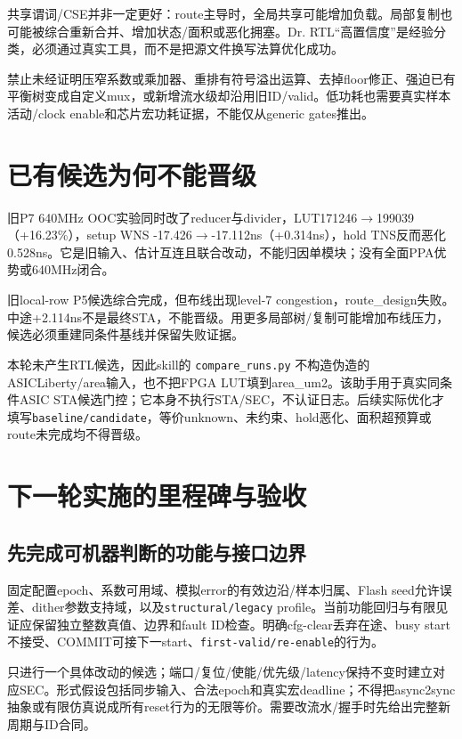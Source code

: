 \documentclass[UTF8,fontset=fandol,10pt,a4paper,openany]{ctexrep}
\newcommand{\code}[1]{\nolinkurl{#1}}
\begin{document}
共享谓词/CSE并非一定更好：route主导时，全局共享可能增加负载。局部复制也可能被综合重新合并、增加状态/面积或恶化拥塞。Dr. RTL“高置信度”是经验分类，必须通过真实工具，而不是把源文件换写法算优化成功。


禁止未经证明压窄系数或乘加器、重排有符号溢出运算、去掉floor修正、强迫已有平衡树变成自定义mux，或新增流水级却沿用旧ID/valid。低功耗也需要真实样本活动/clock enable和芯片宏功耗证据，不能仅从generic gates推出。


\section{已有候选为何不能晋级}


旧P7 640MHz OOC实验同时改了reducer与divider，LUT171246\ensuremath{\rightarrow}199039（+16.23\%），setup WNS -17.426\ensuremath{\rightarrow}-17.112ns（+0.314ns），hold TNS反而恶化0.528ns。它是旧输入、估计互连且联合改动，不能归因单模块；没有全面PPA优势或640MHz闭合。


旧local-row P5候选综合完成，但布线出现level-7 congestion，route\_design失败。中途+2.114ns不是最终STA，不能晋级。用更多局部树/复制可能增加布线压力，候选必须重建同条件基线并保留失败证据。


本轮未产生RTL候选，因此skill的 \code{compare_runs.py} 不构造伪造的ASICLiberty/area输入，也不把FPGA LUT填到area\_um2。该助手用于真实同条件ASIC STA候选门控；它本身不执行STA/SEC，不认证日志。后续实际优化才填写\code{baseline/candidate}，等价unknown、未约束、hold恶化、面积超预算或route未完成均不得晋级。


\section{下一轮实施的里程碑与验收}


\subsection{先完成可机器判断的功能与接口边界}


固定配置epoch、系数可用域、模拟error的有效边沿/样本归属、Flash seed允许误差、dither参数支持域，以及\code{structural/legacy} profile。当前功能回归与有限见证应保留独立整数真值、边界和fault ID检查。明确cfg-clear丢弃在途、busy start不接受、COMMIT可接下一start、\code{first-valid/re-enable}的行为。


只进行一个具体改动的候选；端口/复位/使能/优先级/latency保持不变时建立对应SEC。形式假设包括同步输入、合法epoch和真实宏deadline；不得把async2sync抽象或有限仿真说成所有reset行为的无限等价。需要改流水/握手时先给出完整新周期与ID合同。
\end{document}
